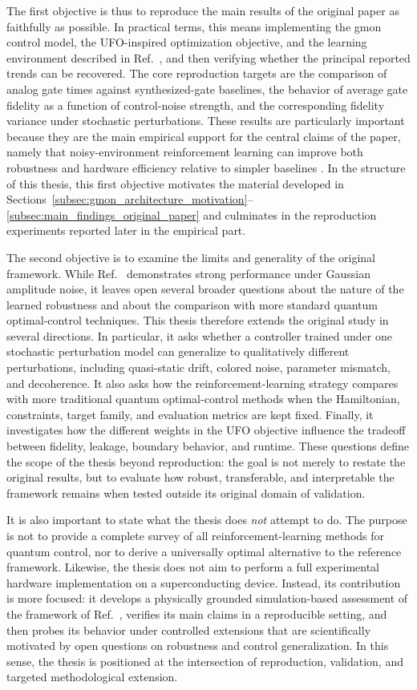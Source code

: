 The first objective is thus to reproduce the main results of the original paper as faithfully as possible. In practical terms, this means implementing the gmon control model, the UFO-inspired optimization objective, and the learning environment described in Ref.~\cite{Niu2019}, and then verifying whether the principal reported trends can be recovered. The core reproduction targets are the comparison of analog gate times against synthesized-gate baselines, the behavior of average gate fidelity as a function of control-noise strength, and the corresponding fidelity variance under stochastic perturbations. These results are particularly important because they are the main empirical support for the central claims of the paper, namely that noisy-environment reinforcement learning can improve both robustness and hardware efficiency relative to simpler baselines \cite{Niu2019}. In the structure of this thesis, this first objective motivates the material developed in Sections~\ref{subsec:gmon_architecture_motivation}--\ref{subsec:main_findings_original_paper} and culminates in the reproduction experiments reported later in the empirical part.

The second objective is to examine the limits and generality of the original framework. While Ref.~\cite{Niu2019} demonstrates strong performance under Gaussian amplitude noise, it leaves open several broader questions about the nature of the learned robustness and about the comparison with more standard quantum optimal-control techniques. This thesis therefore extends the original study in several directions. In particular, it asks whether a controller trained under one stochastic perturbation model can generalize to qualitatively different perturbations, including quasi-static drift, colored noise, parameter mismatch, and decoherence. It also asks how the reinforcement-learning strategy compares with more traditional quantum optimal-control methods when the Hamiltonian, constraints, target family, and evaluation metrics are kept fixed. Finally, it investigates how the different weights in the UFO objective influence the tradeoff between fidelity, leakage, boundary behavior, and runtime. These questions define the scope of the thesis beyond reproduction: the goal is not merely to restate the original results, but to evaluate how robust, transferable, and interpretable the framework remains when tested outside its original domain of validation.

It is also important to state what the thesis does \emph{not} attempt to do. The purpose is not to provide a complete survey of all reinforcement-learning methods for quantum control, nor to derive a universally optimal alternative to the reference framework. Likewise, the thesis does not aim to perform a full experimental hardware implementation on a superconducting device. Instead, its contribution is more focused: it develops a physically grounded simulation-based assessment of the framework of Ref.~\cite{Niu2019}, verifies its main claims in a reproducible setting, and then probes its behavior under controlled extensions that are scientifically motivated by open questions on robustness and control generalization. In this sense, the thesis is positioned at the intersection of reproduction, validation, and targeted methodological extension.

